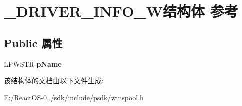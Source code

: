 \hypertarget{struct___d_r_i_v_e_r___i_n_f_o__1_w}{}\section{\+\_\+\+D\+R\+I\+V\+E\+R\+\_\+\+I\+N\+F\+O\+\_\+W结构体 参考}
\label{struct___d_r_i_v_e_r___i_n_f_o__1_w}
\subsection*{Public 属性}
\begin{DoxyCompactItemize}
\item 
\mbox{\label{struct___d_r_i_v_e_r___i_n_f_o__1_w_ab7892be05b10b82dbdd73099e9590c84}} 
L\+P\+W\+S\+TR {\bfseries p\+Name}
\end{DoxyCompactItemize}


该结构体的文档由以下文件生成\+:\begin{DoxyCompactItemize}
\item 
E\+:/\+React\+O\+S-\/0../sdk/include/psdk/winspool.\+h\end{DoxyCompactItemize}
